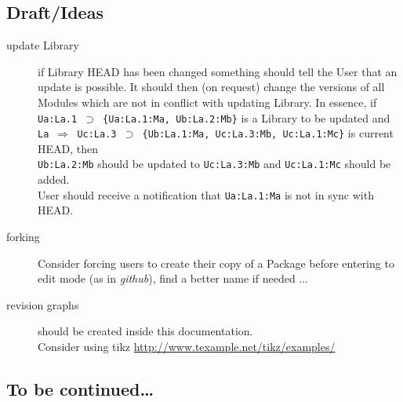 \documentclass[10pt]{article}
\def\headsto{${\Longrightarrow}$ }
\def\hto{\headsto}
\def\eq{${\supset}$ }
\begin{document}
	\subsection*{Draft/Ideas}
	\begin{description}
		\item[update Library] if Library HEAD has been changed something should tell the User that an update is possible. It should then (on request) change the versions of all Modules which are not in conflict with updating Library. In essence, if \\
			{\tt Ua:La.1 \eq \{Ua:La.1:Ma, Ub:La.2:Mb\}} is a Library to be updated and \\
			{\tt La \hto Uc:La.3 \eq \{Ub:La.1:Ma, Uc:La.3:Mb, Uc:La.1:Mc\}} is current HEAD, then\\
			{\tt Ub:La.2:Mb} should be updated to {\tt Uc:La.3:Mb} and {\tt Uc:La.1:Mc} should be added.\\
			User should receive a notification that {\tt Ua:La.1:Ma} is not in sync with HEAD.
		\item[forking] Consider forcing users to create their copy of a Package before entering to edit mode (as in {\em github}), find a better name if needed ...
		\item[revision graphs] should be created inside this documentation. \\
			Consider using tikz \url{http://www.texample.net/tikz/examples/}
	\end{description}

	\subsection*{To be continued\ldots}
\end{document}
